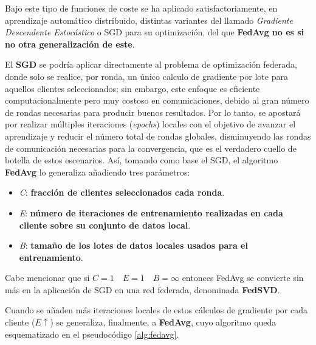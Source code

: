 \documentclass[00-Trabajo_Final.tex]{subfiles}
\begin{document}
Bajo este tipo de funciones de coste se ha aplicado satisfactoriamente, en aprendizaje automático distribuido, distintas variantes del llamado \textit{Gradiente Descendente Estocástico} o SGD para su optimización, del que \textbf{FedAvg no es si no otra generalización de este}.

\vspace{1em}

El \textbf{SGD} se podría aplicar directamente al problema de optimización federada, donde solo se realice, por ronda, un único calculo de gradiente por lote para aquellos clientes seleccionados; sin embargo, este enfoque es eficiente computacionalmente pero muy costoso en comunicaciones, debido al gran número de rondas necesarias para producir buenos resultados. Por lo tanto, se apostará por realizar múltiples iteraciones (\textit{epochs}) locales con el objetivo de avanzar el aprendizaje y reducir el número total de rondas globales, disminuyendo las rondas de comunicación necesarias para la convergencia, que es el verdadero cuello de botella de estos escenarios. Así, tomando como base el SGD, el algoritmo \textbf{FedAvg} lo generaliza añadiendo tres parámetros: 

\begin{itemize}[noitemsep]
    \item \textit{C}: \textbf{fracción de clientes seleccionados cada ronda}.
    \item \textit{E}: \textbf{número de iteraciones de entrenamiento realizadas en cada cliente sobre su conjunto de datos local}.
    \item \textit{B}: \textbf{tamaño de los lotes de datos locales usados para el entrenamiento}.
\end{itemize}

Cabe mencionar que si $C = 1 \quad E = 1 \quad B = \infty$ entonces FedAvg se convierte sin más en la aplicación de SGD en una red federada, denominada \textbf{FedSVD}.

\vspace{1em}

Cuando se añaden más iteraciones locales de estos cálculos de gradiente por cada cliente ($E \uparrow$) se generaliza, finalmente, a \textbf{FedAvg}, cuyo algoritmo queda esquematizado en el pseudocódigo \ref{alg:fedavg}.
\end{document}
